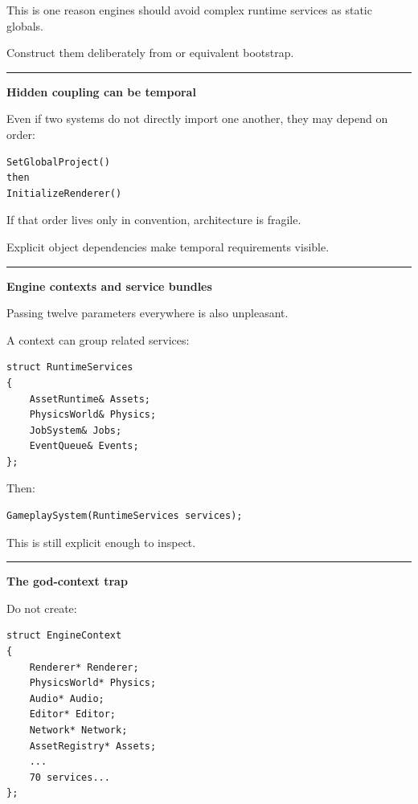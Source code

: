 This is one reason engines should avoid complex runtime services as static globals.

Construct them deliberately from  or equivalent bootstrap.

\begin{center}\rule{0.5\linewidth}{0.5pt}\end{center}

\textbf{Hidden coupling can be temporal}

Even if two systems do not directly import one another, they may depend on order:

\begin{verbatim}
SetGlobalProject()
then
InitializeRenderer()
\end{verbatim}

If that order lives only in convention, architecture is fragile.

Explicit object dependencies make temporal requirements visible.

\begin{center}\rule{0.5\linewidth}{0.5pt}\end{center}

\textbf{Engine contexts and service bundles}

Passing twelve parameters everywhere is also unpleasant.

A context can group related services:

\begin{verbatim}
struct RuntimeServices
{
    AssetRuntime& Assets;
    PhysicsWorld& Physics;
    JobSystem& Jobs;
    EventQueue& Events;
};
\end{verbatim}

Then:

\begin{verbatim}
GameplaySystem(RuntimeServices services);
\end{verbatim}

This is still explicit enough to inspect.

\begin{center}\rule{0.5\linewidth}{0.5pt}\end{center}

\textbf{The god-context trap}

Do not create:

\begin{verbatim}
struct EngineContext
{
    Renderer* Renderer;
    PhysicsWorld* Physics;
    Audio* Audio;
    Editor* Editor;
    Network* Network;
    AssetRegistry* Assets;
    ...
    70 services...
};
\end{verbatim}


